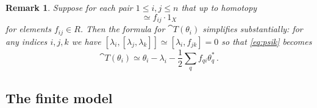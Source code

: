 \documentclass[english,letter paper,12pt,leqno]{article}
\theoremstyle{example}
\newtheorem{remark}[theorem]{Remark}
\numberwithin{equation}{section}
\def\be{\begin{equation}}
\def\ee{\end{equation}}
\begin{document}
\begin{remark}\label{remark:cancellations_transfer} Suppose for each pair $1 \le i,j \le n$ that up to homotopy
\be
[\lambda_i, \lambda_j] \simeq f_{ij} \cdot 1_X
\ee
for elements $f_{ij} \in R$. Then the formula for $\cat{T}(\theta_i)$ simplifies substantially: for any indices $i,j,k$ we have $[\lambda_i, [\lambda_j, \lambda_k]] \simeq [\lambda_i, f_{jk}] = 0$ so that \eqref{eq:psik} becomes
\be
\cat{T}(\theta_i) \simeq \theta_i - \lambda_i - \frac{1}{2} \sum_q f_{qi} \theta^*_q\,.
\ee
\end{remark}

\subsection{The finite model}\label{section:theequivalence}
\end{document}
